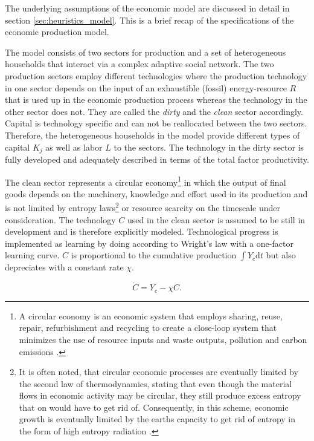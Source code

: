 The underlying assumptions of the economic model are discussed in detail in section \ref{sec:heuristics_model}. This is a brief recap of the specifications of the economic production model. 

The model consists of two sectors for production and a set of heterogeneous households that interact via a complex adaptive social network. The two production sectors employ different technologies where the production technology in one sector depends on the input of an exhaustible (fossil) energy-resource $R$ that is used up in the economic production process whereas the technology in the other sector does not. They are called the \textit{dirty} and the \textit{clean} sector accordingly. Capital is technology specific and can not be reallocated between the two sectors.
Therefore, the heterogeneous households in the model provide different types of capital $K_j$ as well as labor $L$ to the sectors.
The technology in the dirty sector is fully developed and adequately described in terms of the total factor productivity. 

The clean sector represents a circular economy\footnote{A circular economy is an economic system that employs sharing, reuse, repair, refurbishment and recycling to create a close-loop system that minimizes the use of resource inputs and waste outputs, pollution and carbon emissions \citep{Stahel2016, Geissdoerfer2017}.} in which the output of final goods depends on the machinery, knowledge and effort used in its production and is not limited by entropy laws\footnote{It is often noted, that circular economic processes are eventually limited by the second law of thermodynamics, stating that even though the material flows in economic activity may be circular, they still produce excess entropy that on would have to get rid of. Consequently, in this scheme, economic growth is eventually limited by the earths capacity to get rid of entropy in the form of high entropy radiation \citep{Georgescu-Roegen1993, Kaberger2001, Korhonen2018}.} or resource scarcity on the timescale under consideration. The technology $C$ used in the clean sector is assumed to be still in development and is therefore explicitly modeled.
Technological progress is implemented as learning by doing according to Wright's law \citep{wright1936factors, Nagy2013} with a one-factor learning curve. $C$ is proportional to the cumulative production $\int Y_c \mathrm{d}t$ but also depreciates with a constant rate $\chi$.

\begin{equation}
	\dot{C} = Y_c - \chi C.
	\label{eq:approx_lbd}
\end{equation}

